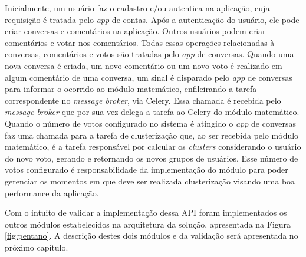 	Inicialmente, um usuário faz o cadastro e/ou autentica na aplicação,
	cuja requisição é tratada pelo \textit{app} de contas.
	Após a autenticação do usuário, ele pode criar conversas e comentários na aplicação.
	Outros usuários podem criar comentários e votar nos comentários.
	Todas essas operações relacionadas à conversas, comentários e votos
	são tratadas pelo \textit{app} de conversas.
	Quando uma nova conversa é criada, um novo comentário ou um novo voto é realizado
	em algum comentário de uma conversa, um sinal é disparado pelo \textit{app} de conversas
	para informar o ocorrido ao módulo matemático, enfileirando a tarefa correspondente
	no \textit{message broker}, via Celery.
	Essa chamada é recebida pelo \textit{message broker} que por sua vez delega
	a tarefa ao Celery do módulo matemático.
	Quando o número de votos configurado no sistema é atingido o \textit{app} de conversas
	faz uma chamada para a tarefa de clusterização que, ao ser recebida pelo módulo matemático,
	é a tarefa responsável por calcular os \textit{clusters} considerando o usuário do novo voto,
	gerando e retornando os novos grupos de usuários. Esse número de votos configurado é responsabilidade
	da implementação do módulo para poder gerenciar os momentos em que deve ser realizada clusterização visando 
	uma boa performance da aplicação.
	
	Com o intuito de validar a implementação dessa API foram implementados os outros módulos estabelecidos na arquitetura da
	solução, apresentada na Figura \ref{fig:pentano}. A descrição destes dois módulos e da validação será apresentada no próximo
	capítulo.
	
	
	